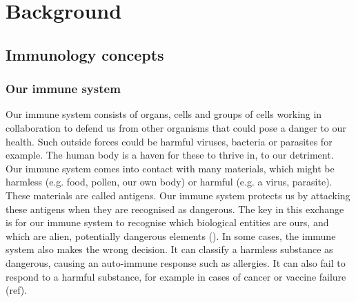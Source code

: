 \chapter{Background}

\section{Immunology concepts}

\subsection{Our immune system} \label{bg:immunesystem}

Our immune system consists of organs, cells and groups of cells working in collaboration to defend us from other organisms that could pose a danger to our health. Such outside forces could be harmful viruses, bacteria or parasites for example. The human body is a haven for these to thrive in, to our detriment. Our immune system comes into contact with many materials, which might be harmless (e.g. food, pollen, our own body) or harmful (e.g. a virus, parasite). These materials are called antigens. Our immune system protects us by attacking these antigens when they are recognised as dangerous. The key in this exchange is for our immune system to recognise which biological entities are ours, and which are alien, potentially dangerous elements (\cite{http://www.imgt.org/IMGTeducation/Tutorials/ImmuneSystem/UK/the_immune_system.pdf}). In some cases, the immune system also makes the wrong decision. It can classify a harmless substance as dangerous, causing an auto-immune response such as allergies. It can also fail to respond to a harmful substance, for example in cases of cancer or vaccine failure  (ref).

